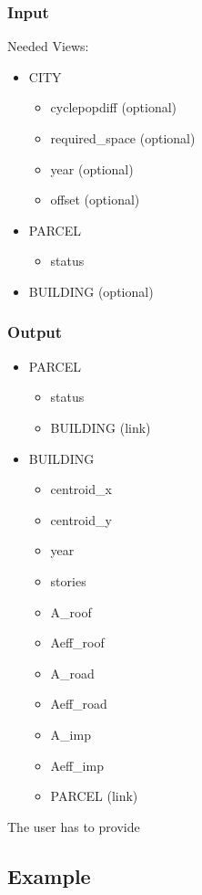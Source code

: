 \documentclass{scrartcl}
\begin{document}
\subsubsection{Input}\hypertarget{input}{}\label{input}

Needed Views:

\begin{itemize}
\item CITY


\begin{itemize}
\item cyclepopdiff (optional)
\item required\_space (optional)
\item year (optional)
\item offset (optional)
\end{itemize}
\item PARCEL


\begin{itemize}
\item status
\end{itemize}
\item BUILDING (optional)
\end{itemize}

\subsubsection{Output}\hypertarget{output}{}\label{output}

\begin{itemize}
\item PARCEL


\begin{itemize}
\item status
\item BUILDING (link)
\end{itemize}
\item BUILDING


\begin{itemize}
\item centroid\_x
\item centroid\_y
\item year
\item stories
\item A\_roof
\item Aeff\_roof
\item A\_road
\item Aeff\_road
\item A\_imp
\item Aeff\_imp
\item PARCEL (link)
\end{itemize}
\end{itemize}

The user has to provide

\subsection{Example}\hypertarget{example}{}\label{example}
\end{document}
